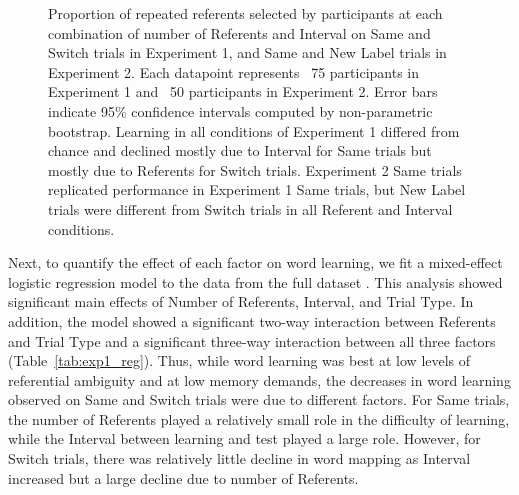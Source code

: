 \documentclass[man,floatsintext]{apa6}
\begin{document}
 \begin{figure}[!t]
	\caption{\label{fig:exp1_2_data} Proportion of repeated referents selected by participants at each combination of number of Referents and Interval on Same and Switch trials in Experiment 1, and Same and New Label trials in Experiment 2. Each datapoint represents ~75 participants in Experiment 1 and ~50 participants in Experiment 2. Error bars indicate 95\% confidence intervals computed by non-parametric bootstrap. Learning in all conditions of Experiment 1 differed from chance and declined mostly due to Interval for Same trials but mostly due to Referents for Switch trials. Experiment 2 Same trials replicated performance in Experiment 1 Same trials, but New Label trials were different from Switch trials in all Referent and Interval conditions.} 
\end{figure}

Next, to quantify the effect of each factor on word learning, we fit a mixed-effect logistic regression model to the data from the full dataset \cite{Baayen2008}. This analysis showed significant main effects of Number of Referents, Interval, and Trial Type. In addition, the model showed a significant two-way interaction between Referents and Trial Type and a significant three-way interaction between all three factors (Table~\ref{tab:exp1_reg}). Thus, while word learning was best at low levels of referential ambiguity and at low memory demands, the decreases in word learning observed on Same and Switch trials were due to different factors. For Same trials, the number of Referents played a relatively small role in the difficulty of learning, while the Interval between learning and test played a large role. However, for Switch trials, there was relatively little decline in word mapping as Interval increased but a large decline due to number of Referents. 
\end{document}
